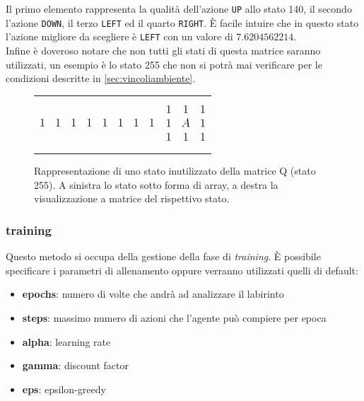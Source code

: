Il primo elemento rappresenta la qualit\`{a} dell'azione \lstinline[style=cmd]|UP| allo stato 140, il secondo l'azione  \lstinline[style=cmd]|DOWN|, il terzo  \lstinline[style=cmd]|LEFT| ed il quarto  \lstinline[style=cmd]|RIGHT|. \`{E} facile intuire che in questo stato l'azione migliore  da scegliere \`{e}  \lstinline[style=cmd]|LEFT| con un valore di  $7.6204562214$.\\

Infine \`{e} doveroso notare che non tutti gli stati di questa matrice saranno utilizzati, un esempio \`{e} lo stato 255 che non si potr\`{a} mai verificare per le condizioni descritte in \autoref{sec:vincoliambiente}.\\

\begin{figure}[H]
	\begin{tabular}{m{20em} m{20em}}
		\begin{equation*}
			\large
			\begin{matrix}
				1 & 1 & 1 & 1 & 1 & 1 & 1 & 1
			\end{matrix}
		\end{equation*}
		&
		\begin{equation*}
			\large
			\begin{matrix}
				1 & 1 & 1\\
				1 & A & 1\\
				1 & 1 & 1\\
			\end{matrix}
		\end{equation*}
	\end{tabular}
	\caption{Rappresentazione di uno stato inutilizzato della matrice Q (stato 255). A sinistra lo stato sotto forma di array, a destra la visualizzazione a matrice del rispettivo stato.}
\end{figure}

\subsubsection{training}

Questo metodo si occupa della gestione della fase di \textit{training}. \`{E} possibile specificare i parametri di allenamento oppure verranno utilizzati quelli di default:

\begin{itemize}
	\item \textbf{epochs}: numero di volte che andr\`{a} ad analizzare il labirinto
	\item \textbf{steps}: massimo numero di azioni che l'agente pu\`{o} compiere per epoca
	\item \textbf{alpha}: learning rate
	\item \textbf{gamma}: discount factor
	\item \textbf{eps}:  epsilon-greedy
\end{itemize}

